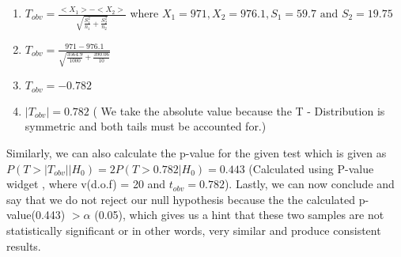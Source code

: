 \begin{enumerate}
    \item $T_{obv} = \frac{<X_1> - <X_2>}{\sqrt{\frac{S_1^2}{n_1} + \frac{S_2^2}{n_2}}}$ where $X_1 = 971, X_2 = 976.1, S_1 = 59.7 \text{ and } S_2 = 19.75$ 
    \item $T_{obv} = \frac{971 - 976.1}{\sqrt{\frac{3564.9}{1000} + \frac{390.06}{10}}}$
    \item $T_{obv} = - 0.782$
    \item $|T_{obv}| = 0.782$ ( We take the absolute value because the T - Distribution is symmetric and both tails must be accounted for.)
\end{enumerate}
Similarly, we can also calculate the p-value for the given test which is given as $P(T > |T_{obv}| | H_0) = 2P(T > 0.782 | H_0) = 0.443 $ (Calculated using P-value widget \cite{wolfram-pvalue}, where v(d.o.f) = 20 and $t_{obv} = 0.782$). Lastly, we can now conclude and say that we do not reject our null hypothesis because the the calculated p-value(0.443)  $> \alpha$ (0.05), which gives us a hint that these two samples are not statistically significant or in other words, very similar and produce consistent results.